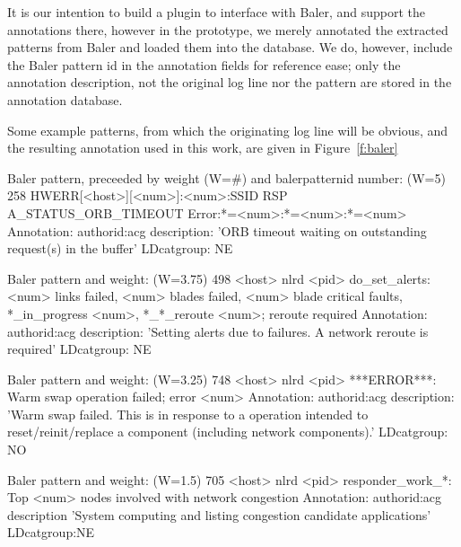 It is our intention to
build a plugin to interface with Baler, and support the annotations there,
however in the prototype, we merely annotated the extracted patterns from
Baler and loaded them into the database.
We do, however, include the Baler pattern id in the annotation fields
for reference ease; only the annotation description, not the original log line nor the pattern
are stored in the annotation database.

Some example patterns, from which the originating log line will be obvious, and
the resulting annotation used in this work, are given in Figure~\ref{f:baler}

\begin{figure*}
\begin{annol}

Baler pattern, preceeded by weight (W=#) and balerpatternid number:
(W=5)        258   HWERR[<host>][<num>]:<num>:SSID RSP A_STATUS_ORB_TIMEOUT Error:*=<num>:*=<num>:*=<num>
Annotation:
authorid:acg  description: 'ORB timeout waiting on outstanding request(s) in the buffer'  LDcatgroup: NE

Baler pattern and weight:
(W=3.75)     498   <host> nlrd <pid> do_set_alerts: <num> links failed, <num> blades failed, <num> blade critical faults, *_in_progress <num>, *_*_reroute <num>; reroute required
Annotation:
authorid:acg  description: 'Setting alerts due to failures. A network reroute is required' LDcatgroup: NE

Baler pattern and weight:
(W=3.25)     748   <host> nlrd <pid> ***ERROR***: Warm swap operation failed; error <num>
Annotation:
authorid:acg description: 'Warm swap failed. This is in response to a operation intended to reset/reinit/replace a component (including network components).' LDcatgroup: NO

Baler pattern and weight:
(W=1.5)      705   <host> nlrd <pid> responder_work_*: Top <num> nodes involved with network congestion
Annotation:
authorid:acg description 'System computing and listing congestion candidate applications' LDcatgroup:NE
\end{annol}
\caption{Example Baler patterns extracted from log lines and their annotated versions. Events to annotate are based on
knowledge of significant events. Annotation descriptions can provide additional context to non-self-explanatory log messages.}
\label{f:baler}
\end{figure*}








